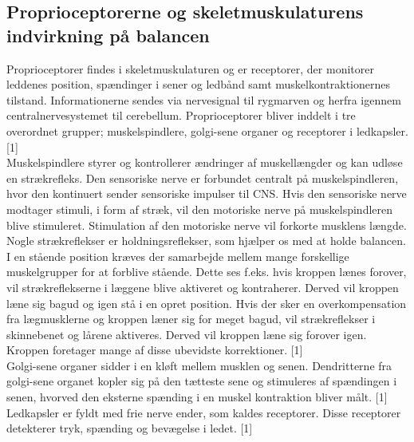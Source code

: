 \subsection{Proprioceptorerne og skeletmuskulaturens indvirkning på balancen}
Proprioceptorer findes i skeletmuskulaturen og er receptorer, der monitorer leddenes position, spændinger i sener og ledbånd samt muskelkontraktionernes tilstand. Informationerne sendes via nervesignal til rygmarven og herfra igennem centralnervesystemet til cerebellum. Proprioceptorer bliver inddelt i tre overordnet grupper; muskelspindlere, golgi-sene organer og receptorer i ledkapsler.[1] \\
Muskelspindlere styrer og kontrollerer ændringer af muskellængder og kan udløse en strækrefleks. Den sensoriske nerve er forbundet centralt på muskelspindleren, hvor den kontinuert sender sensoriske impulser til CNS. Hvis den sensoriske nerve modtager stimuli, i form af stræk, vil den motoriske nerve på muskelspindleren blive stimuleret. Stimulation af den motoriske nerve vil forkorte musklens længde. Nogle strækreflekser er holdningsreflekser, som hjælper os med at holde balancen. I en stående position kræves der samarbejde mellem mange forskellige muskelgrupper for at forblive stående. Dette ses f.eks. hvis kroppen lænes forover, vil strækreflekserne i læggene blive aktiveret og kontraherer. Derved vil kroppen læne sig bagud og igen stå i en opret position. Hvis der sker en overkompensation fra lægmusklerne og kroppen læner sig for meget bagud, vil strækreflekser i skinnebenet og lårene aktiveres. Derved vil kroppen læne sig forover igen. Kroppen foretager mange af disse ubevidste korrektioner. [1] \\ %
Golgi-sene organer sidder i en kløft mellem musklen og senen. Dendritterne fra golgi-sene organet kopler sig på den tætteste sene og stimuleres af spændingen i senen, hvorved den eksterne spænding i en muskel kontraktion bliver målt. [1] \\
Ledkapsler er fyldt med frie nerve ender, som kaldes receptorer. Disse receptorer detekterer tryk, spænding og bevægelse i ledet. [1]  %

